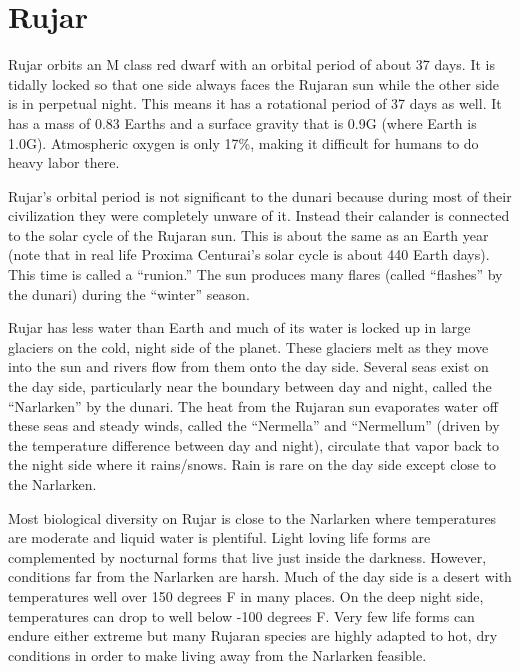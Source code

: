 
\chapter{Rujar}

Rujar orbits an M class red dwarf with an orbital period of about 37 days. It is tidally
locked so that one side always faces the Rujaran sun while the other side is in perpetual
night. This means it has a rotational period of 37 days as well. It has a mass of 0.83 Earths
and a surface gravity that is 0.9G (where Earth is 1.0G). Atmospheric oxygen is only 17\%,
making it difficult for humans to do heavy labor there.

Rujar's orbital period is not significant to the dunari because during most of their
civilization they were completely unware of it. Instead their calander is connected to the solar
cycle of the Rujaran sun. This is about the same as an Earth year (note that in real life
Proxima Centurai's solar cycle is about 440 Earth days). This time is called a ``runion.'' The
sun produces many flares (called ``flashes'' by the dunari) during the ``winter'' season.

Rujar has less water than Earth and much of its water is locked up in large glaciers on the
cold, night side of the planet. These glaciers melt as they move into the sun and rivers flow
from them onto the day side. Several seas exist on the day side, particularly near the boundary
between day and night, called the ``Narlarken'' by the dunari. The heat from the Rujaran sun
evaporates water off these seas and steady winds, called the ``Nermella'' and ``Nermellum''
(driven by the temperature difference between day and night), circulate that vapor back to the
night side where it rains/snows. Rain is rare on the day side except close to the Narlarken.

Most biological diversity on Rujar is close to the Narlarken where temperatures are moderate
and liquid water is plentiful. Light loving life forms are complemented by nocturnal forms that
live just inside the darkness. However, conditions far from the Narlarken are harsh. Much of the
day side is a desert with temperatures well over 150 degrees F in many places. On the deep night
side, temperatures can drop to well below -100 degrees F. Very few life forms can endure either
extreme but many Rujaran species are highly adapted to hot, dry conditions in order to make
living away from the Narlarken feasible.

